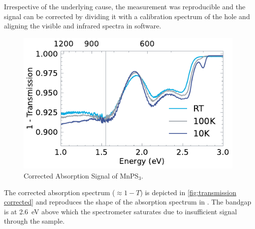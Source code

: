 \documentclass[
	oneside,
	parskip=half,
	a4paper,
]{scrbook}
\begin{document}
Irrespective of the underlying cause, the measurement was reproducible and the signal can be corrected by dividing it with a calibration spectrum of the hole and aligning the visible and infrared spectra in software.

\begin{figure}
	\centering
	\includegraphics{../figures/2024-03-15 MnPS3 transmission processed.pdf }
	\caption{Corrected Absorption Signal of MnPS$_3$.}
	\label{fig:transmission corrected}
\end{figure}
The corrected absorption spectrum ($\approx 1 - T$) is depicted in \autoref{fig:transmission corrected} and reproduces the shape of the absorption spectrum in \cite{MnPS3_transmission}.
The bandgap is at \SI{2.6}{eV} above which the spectrometer saturates due to insufficient signal through the sample.
\end{document}
